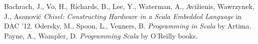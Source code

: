\documentclass[10pt,twocolumn]{article}
\def\note#1{\noindent{\bf [Note: #1]}}
\begin{document}
% 
% 
% 
\begin{thebibliography}{50}
 Bachrach, J., Vo, H., Richards, B., Lee, Y., Waterman,
  A., Avi\v{z}ienis, Wawrzynek, J., Asanovi\'{c} \textsl{Chisel:
    Constructing Hardware in a Scala Embedded Language}
in DAC '12.
Odersky, M., Spoon, L., Venners,
  B. \textsl{Programming in Scala} by Artima.
Payne, A., Wampler, D.
  \textsl{Programming Scala} by O'Reilly books.
\end{thebibliography}
 
\end{document}
